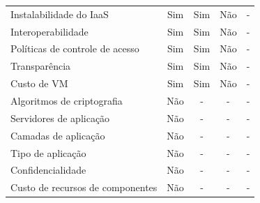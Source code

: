 \documentclass[conference]{IEEEtran}
\begin{document}
\begin{table}[]
\begin{tabular}{@{}lcccc@{}}
Instalabilidade do IaaS                           & Sim                                     & Sim                                     & \cellcolor[HTML]{EA9999}Não             & \cellcolor[HTML]{EA9999}-   \\
Interoperabilidade                                & Sim                                     & Sim                                     & \cellcolor[HTML]{EA9999}Não             & \cellcolor[HTML]{EA9999}-   \\
Políticas de controle de acesso                   & Sim                                     & Sim                                     & \cellcolor[HTML]{EA9999}Não             & \cellcolor[HTML]{EA9999}-   \\
Transparência                                     & Sim                                     & Sim                                     & \cellcolor[HTML]{EA9999}Não             & \cellcolor[HTML]{EA9999}-   \\
Custo de VM                                       & Sim                                     & Sim                                     & \cellcolor[HTML]{EA9999}Não             & \cellcolor[HTML]{EA9999}-   \\
Algoritmos de criptografia                        & \cellcolor[HTML]{EA9999}Não             & \cellcolor[HTML]{EA9999}-               & \cellcolor[HTML]{EA9999}-               & \cellcolor[HTML]{EA9999}-   \\
Servidores de aplicação                           & \cellcolor[HTML]{EA9999}Não             & \cellcolor[HTML]{EA9999}-               & \cellcolor[HTML]{EA9999}-               & \cellcolor[HTML]{EA9999}-   \\
Camadas de aplicação                              & \cellcolor[HTML]{EA9999}Não             & \cellcolor[HTML]{EA9999}-               & \cellcolor[HTML]{EA9999}-               & \cellcolor[HTML]{EA9999}-   \\
Tipo de aplicação                                 & \cellcolor[HTML]{EA9999}Não             & \cellcolor[HTML]{EA9999}-               & \cellcolor[HTML]{EA9999}-               & \cellcolor[HTML]{EA9999}-   \\
Confidencialidade                                 & \cellcolor[HTML]{EA9999}Não             & \cellcolor[HTML]{EA9999}-               & \cellcolor[HTML]{EA9999}-               & \cellcolor[HTML]{EA9999}-   \\
Custo de recursos de componentes                  & \cellcolor[HTML]{EA9999}Não             & \cellcolor[HTML]{EA9999}-               & \cellcolor[HTML]{EA9999}-               & \cellcolor[HTML]{EA9999}-   \\

\end{tabular}
\end{table}
\end{document}
